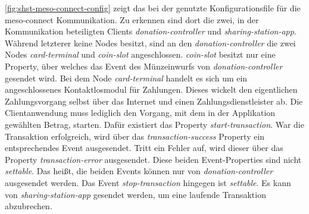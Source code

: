 \autoref{fig:shst-meso-connect-config} zeigt das bei der \shst{} genutzte Konfigurationsfile für die 
meso-connect Kommunikation. Zu erkennen sind dort die zwei, in der Kommunikation beteiligten Clients
\emph{donation-controller} und \emph{sharing-station-app}. Während letzterer keine Nodes
besitzt, sind an den \emph{donation-controller} die zwei Nodes \emph{card-terminal} und 
\emph{coin-slot} angeschlossen. \emph{coin-slot} besitzt nur eine Property, über
welches das Event des Münzeinwurfs von \emph{donation-controller} gesendet wird. Bei dem Node
\emph{card-terminal} handelt es sich um ein angeschlossenes Kontaktlosmodul für Zahlungen. Dieses wickelt
den eigentlichen Zahlungsvorgang selbst über das Internet und einen Zahlungsdienstleister ab. 
Die Clientanwendung muss lediglich den Vorgang, mit dem in der Applikation gewählten Betrag,
starten. Dafür existiert das Property \emph{start-transaction}. War die Transaktion erfolgreich,
wird über das \emph{transaction-success} Property ein entsprechendes Event ausgesendet. Tritt ein 
Fehler auf, wird dieser über das Property \emph{transaction-error} ausgesendet. Diese beiden Event-Properties
sind nicht \emph{settable}. Das heißt, die beiden Events können nur von \emph{donation-controller} ausgesendet
werden. Das Event \emph{stop-transaction} hingegen ist \emph{settable}. 
Es kann von \emph{sharing-station-app} gesendet werden, um eine laufende Transaktion abzubrechen. 
